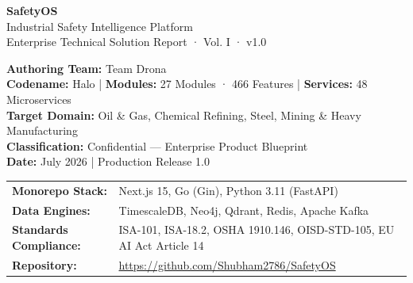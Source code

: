 \documentclass[11pt,a4paper]{article}
\begin{document}
\begin{titlepage}
    \centering
    \vspace*{1.5cm}
    
    {\Huge \bfseries \color{NavyPrimary} SafetyOS}\\[0.5cm]
    {\Large \color{SlateNavy} Industrial Safety Intelligence Platform}\\[0.3cm]
    {\small \color{gray} Enterprise Technical Solution Report · Vol. I · v1.0}\\[2cm]
    
    \begin{tcolorbox}[colback=LightMuted,colframe=NavyPrimary,arc=2mm,boxrule=1pt,width=0.95\textwidth]
        \centering
        \small
        \textbf{Authoring Team:} Team Drona\\[0.15cm]
        \textbf{Codename:} Halo | \textbf{Modules:} 27 Modules · 466 Features | \textbf{Services:} 48 Microservices\\[0.15cm]
        \textbf{Target Domain:} Oil \& Gas, Chemical Refining, Steel, Mining \& Heavy Manufacturing\\[0.15cm]
        \textbf{Classification:} Confidential — Enterprise Product Blueprint\\[0.15cm]
        \textbf{Date:} July 2026 | Production Release 1.0
    \end{tcolorbox}
    
    \vfill
    
    \begin{tabularx}{\textwidth}{lX}
        \textbf{Monorepo Stack:} & Next.js 15, Go (Gin), Python 3.11 (FastAPI)\\
        \textbf{Data Engines:} & TimescaleDB, Neo4j, Qdrant, Redis, Apache Kafka\\
        \textbf{Standards Compliance:} & ISA-101, ISA-18.2, OSHA 1910.146, OISD-STD-105, EU AI Act Article 14\\
        \textbf{Repository:} & \url{https://github.com/Shubham2786/SafetyOS}
    \end{tabularx}
    
    \vspace*{1cm}
\end{titlepage}

\newpage
\tableofcontents
\newpage

\end{document}
